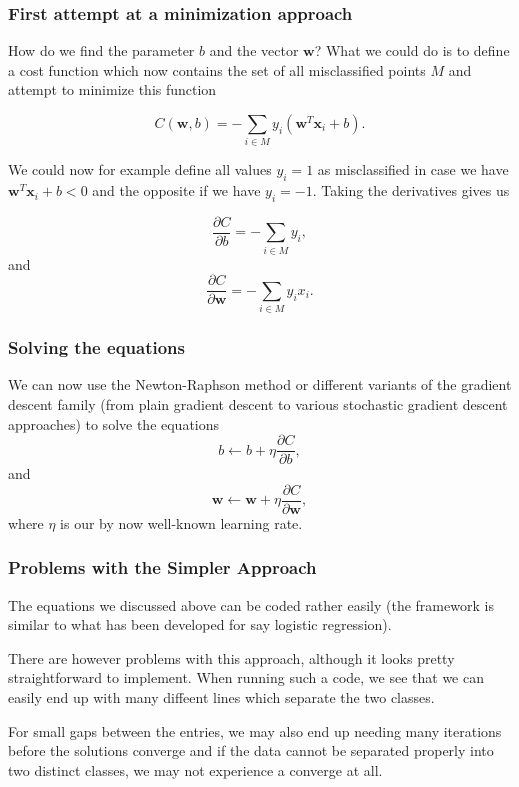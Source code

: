 \documentclass{beamer}
\begin{document}
\begin{frame}
\frametitle{First attempt at a minimization approach}

How do we find the parameter $b$ and the vector $\bm{w}$? What we could
do is to define a cost function which now contains the set of all
misclassified points $M$ and attempt to minimize this function

\[
C(\bm{w},b) = -\sum_{i\in M} y_i(\bm{w}^T\bm{x}_i+b).
\]

We could now for example define all values $y_i =1$ as misclassified
in case we have $\bm{w}^T\bm{x}_i+b < 0$ and the opposite if we have
$y_i=-1$. Taking the derivatives gives us

\[
\frac{\partial C}{\partial b} = -\sum_{i\in M} y_i,
\]
and 
\[
\frac{\partial C}{\partial \bm{w}} = -\sum_{i\in M} y_ix_i.
\]
\end{frame}

\begin{frame}
\frametitle{Solving the equations}

We can now use the Newton-Raphson method or different variants of the gradient descent family (from plain gradient descent to various stochastic gradient descent approaches) to solve the equations
\[
b \leftarrow b +\eta \frac{\partial C}{\partial b},
\]
and
\[
\bm{w} \leftarrow \bm{w} +\eta \frac{\partial C}{\partial \bm{w}},
\]
where $\eta$ is our by now well-known learning rate.
\end{frame}

\begin{frame}
\frametitle{Problems with the Simpler Approach}

The equations we discussed above can be coded rather easily (the
framework is similar to what has been  developed for say logistic
regression).

There are however problems with this approach, although it looks
pretty straightforward to implement. When running such a code, we see that we can easily end up with many diffeent lines which separate the two classes.

For small
gaps between the entries, we may also end up needing many iterations
before the solutions converge and if the data cannot be separated
properly into two distinct classes, we may not experience a converge
at all.
\end{frame}
\end{document}
